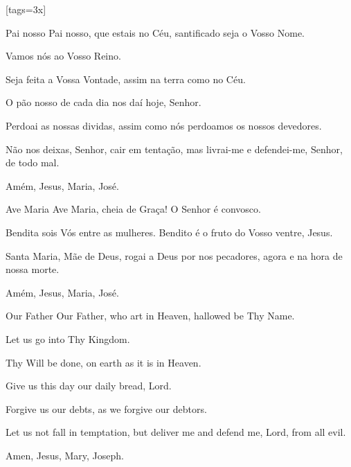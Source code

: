 %

\renewcommand{\thesongnum}{\Roman{songnum}}
\setcounter{songnum}{1}

[tags={3x}]
  \vspace*{\fill}
  \begin{passage}[PT]{Pai nosso}
    Pai nosso,
    que estais no Céu,
    santificado seja o Vosso Nome.
    \par
    Vamos nós ao Vosso Reino.
    \par
    Seja feita a Vossa Vontade,
    assim na terra como no Céu.
    \par
    O pão nosso de cada dia nos daí hoje, Senhor.
    \par
    Perdoai as nossas dividas,
    assim como nós perdoamos os nossos devedores.
    \par
    Não nos deixas, Senhor, cair em tentação,
    mas livrai-me e defendei-me, Senhor,
    de todo mal.
    \par
    Amém, Jesus, Maria, José.
  \end{passage}
  \begin{passage}[PT]{Ave Maria}
    Ave Maria,
    cheia de Graça!
    O Senhor é convosco.
    \par
    Bendita sois Vós entre as mulheres.
    Bendito é o fruto do Vosso ventre, Jesus.
    \par
    Santa Maria, Mãe de Deus,
    rogai a Deus por nos pecadores,
    agora e na hora de nossa morte.
    \par
    Amém, Jesus, Maria, José.
  \end{passage}
  \vspace*{\fill}
  \hardbrk
  \vspace*{1.65ex} %
  \vspace*{\fill}
  \begin{passage}[EN]{Our Father}
    Our Father,
    who art in Heaven,
    hallowed be Thy Name.
    \par
    Let us go into Thy Kingdom.
    \par
    Thy Will be done,
    on earth as it is in Heaven.
    \par
    Give us this day our daily bread, Lord.
    \par
    Forgive us our debts,
    as we forgive our debtors.
    \par
    Let us not fall in temptation,
    but deliver me and defend me, Lord,
    from all evil.
    \par
    Amen, Jesus, Mary, Joseph.
  \end{passage}
